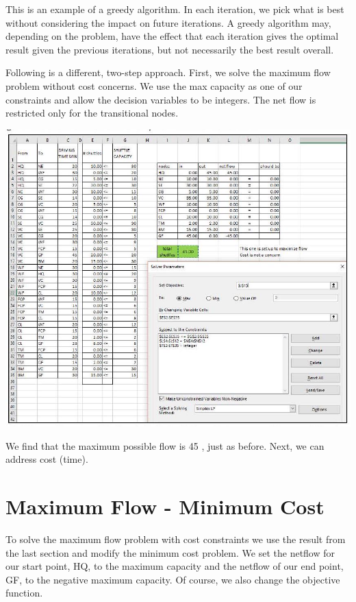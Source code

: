 \documentclass[10pt]{article}
\begin{document}
This is an example of a greedy algorithm. In each iteration, we pick what is best without considering the impact on future iterations. A greedy algorithm may, depending on the problem, have the effect that each iteration gives the optimal result given the previous iterations, but not necessarily the best result overall.

Following is a different, two-step approach. First, we solve the maximum flow problem without cost concerns. We use the max capacity as one of our constraints and allow the decision variables to be integers. The net flow is restricted only for the transitional nodes.

\includegraphics[max width=\textwidth]{2022_07_05_5945264bba2a5f6ba667g-50(1)}

We find that the maximum possible flow is 45 , just as before. Next, we can address cost (time).

\section{Maximum Flow - Minimum Cost}
To solve the maximum flow problem with cost constraints we use the result from the last section and modify the minimum cost problem. We set the netflow for our start point, HQ, to the maximum capacity and the netflow of our end point, GF, to the negative maximum capacity. Of course, we also change the objective function.
\end{document}
